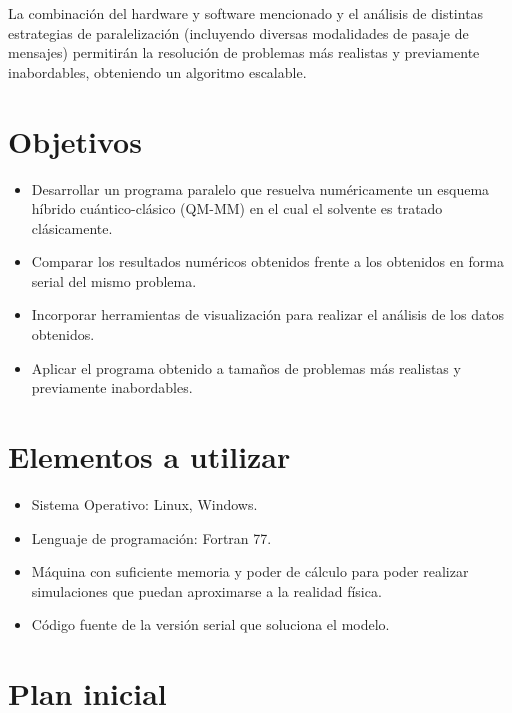 \documentclass[a4paper, 12pt]{article}
\begin{document}
La combinaci\'on del hardware y software mencionado y el an\'alisis de distintas estrategias de paralelizaci\'on (incluyendo diversas modalidades de pasaje de mensajes) permitir\'an la resoluci\'on de problemas m\'as realistas y previamente inabordables, obteniendo un algoritmo escalable.


\section*{Objetivos}

\begin{itemize}
\item Desarrollar un programa paralelo que resuelva num\'ericamente un esquema h\'ibrido cu\'antico-cl\'asico (QM-MM) en el cual el solvente es tratado cl\'asicamente.

\item Comparar los resultados num\'ericos obtenidos frente a los obtenidos en forma serial del mismo problema.

\item Incorporar herramientas de visualizaci\'on para realizar el an\'alisis de los datos obtenidos.

\item Aplicar el programa obtenido a tama\~nos de problemas m\'as realistas y previamente inabordables.
\end{itemize}

\section*{Elementos a utilizar}

\begin{itemize}
\item Sistema Operativo: Linux, Windows.

\item Lenguaje de programaci\'on: Fortran 77.

\item M\'aquina con suficiente memoria y poder de c\'alculo para poder realizar simulaciones que puedan aproximarse a la realidad f\'isica.

\item C\'odigo fuente de la versi\'on serial que soluciona el modelo.
\end{itemize}

\section*{Plan inicial}
\end{document}
